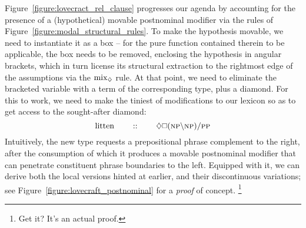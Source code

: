Figure~\ref{figure:lovecract_rel_clause} progresses our agenda by accounting for the presence of a (hypothetical) movable postnominal modifier via the rules of Figure~\ref{figure:modal_structural_rules}.
To make the hypothesis movable, we need to instantiate it as a box -- for the pure function contained therein to be applicable, the box needs to be removed, enclosing the hypothesis in angular brackets, which in turn license its structural extraction to the rightmost edge of the assumptions via the $\rulestyle{mix}_{\diamond}$ rule.
At that point, we need to eliminate the bracketed variable with a term of the corresponding type, plus a diamond.
For this to work, we need to make the tiniest of modifications to our lexicon so as to get access to the sought-after diamond:
\begin{equation}\label{equation:litten}
	\w{litten} \qquad :: \qquad \diamond\bx (\np[s]\divleft\np[s])\divright\pp[s]
\end{equation}
Intuitively, the new type requests a prepositional phrase complement to the right, after the consumption of which it produces a movable postnominal modifier that can penetrate constituent phrase boundaries to the left.
Equipped with it, we can derive both the local versions hinted at earlier, and their discontinuous variations; see Figure~\ref{figure:lovecraft_postnominal} for a \textit{proof} of concept.%
\footnote{Get it? It's an actual proof.} 

